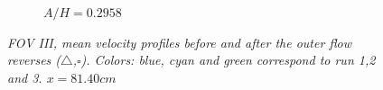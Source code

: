 \documentclass[review]{elsarticle}
\begin{document}
\begin{figure}[]
{\begin{subfigure}[b]{.3\textwidth}
\caption{$A/H=0.2958$}
\end{subfigure}%
}
\caption{ \textit{FOV III, mean velocity profiles before and after the outer flow reverses ($\triangle$,$\square$). Colors: blue, cyan and green correspond to run 1,2 and 3. 
$x=81.40cm$} }
\label{fig:PIV_FOV5}
\end{figure}
\end{document}
